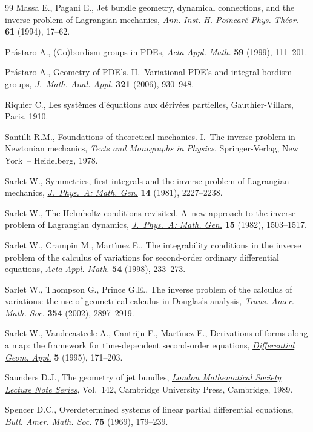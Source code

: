\documentclass[pdftex]{sigma}
\begin{document}
\begin{thebibliography}{99}
Massa E., Pagani E., Jet bundle geometry, dynamical connections, and the
  inverse problem of {L}agrangian mechanics, \textit{Ann. Inst. H. Poincar\'e
  Phys. Th\'eor.} \textbf{61} (1994), 17--62.

Pr{\'a}staro A., ({C}o)bordism groups in {PDE}s, \href{http://dx.doi.org/10.1023/A:1006346916360}{\textit{Acta Appl. Math.}}
  \textbf{59} (1999), 111--201.

Pr{\'a}staro A., Geometry of {PDE}'s. {II}.~{V}ariational {PDE}'s and integral
  bordism groups, \href{http://dx.doi.org/10.1016/j.jmaa.2005.08.037}{\textit{J.~Math. Anal. Appl.}} \textbf{321} (2006), 930--948.

Riquier C., Les syst\`emes d'\'equations aux d\'eriv\'ees partielles,
  Gauthier-Villars, Paris, 1910.

Santilli R.M., Foundations of theoretical mechanics. {I}.~The inverse problem
  in Newtonian mechanics, \textit{Texts and Monographs in Physics}, Springer-Verlag, New York~-- Heidelberg, 1978.

Sarlet W., Symmetries, f\/irst integrals and the inverse problem of {L}agrangian
  mechanics, \href{http://dx.doi.org/10.1088/0305-4470/14/9/018}{\textit{J.~Phys.~A: Math. Gen.}} \textbf{14} (1981), 2227--2238.

Sarlet W., The {H}elmholtz conditions revisited. {A}~new approach to the
  inverse problem of {L}agrangian dynamics, \href{http://dx.doi.org/10.1088/0305-4470/15/5/013}{\textit{J.~Phys.~A: Math. Gen.}}
  \textbf{15} (1982), 1503--1517.

Sarlet W., Crampin M., Mart{\'{\i}}nez E., The integrability conditions in the
  inverse problem of the calculus of variations for second-order ordinary
  dif\/ferential equations, \href{http://dx.doi.org/10.1023/A:1006102121371}{\textit{Acta Appl. Math.}} \textbf{54} (1998),
  233--273.

Sarlet W., Thompson G., Prince G.E., The inverse problem of the calculus of
  variations: the use of geometrical calculus in {D}ouglas's analysis,
  \href{http://dx.doi.org/10.1090/S0002-9947-02-02994-X}{\textit{Trans. Amer. Math. Soc.}} \textbf{354} (2002), 2897--2919.

Sarlet W., Vandecasteele A., Cantrijn F., Mart{\'{\i}}nez E., Derivations of
  forms along a map: the framework for time-dependent second-order equations,
  \href{http://dx.doi.org/10.1016/0926-2245(95)00013-T}{\textit{Differential Geom. Appl.}} \textbf{5} (1995), 171--203.

Saunders D.J., The geometry of jet bundles, \href{http://dx.doi.org/10.1017/CBO9780511526411}{\textit{London Mathematical Society
  Lecture Note Series}}, Vol.~142, Cambridge University Press, Cambridge, 1989.

Spencer D.C., Overdetermined systems of linear partial dif\/ferential equations,
  \textit{Bull. Amer. Math. Soc.} \textbf{75} (1969), 179--239.

\end{thebibliography}\LastPageEnding
\end{document}
